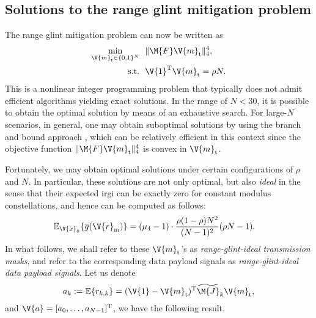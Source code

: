 \documentclass[journal,a4paper,10pt, romanappendices]{IEEEtran}
\begin{document}
\subsection{Solutions to the range glint mitigation problem}\label{ssec:solving_rgm}
The range glint mitigation problem can now be written as
\begin{subequations}\label{opt_generic}
\begin{align}
    \min_{\V{m}_{\rm t}\in\{0,1\}^N}&~~\|\M{F}\V{m}_{\rm t}\|_4^4,\\
    {\rm s.t.}&~~\V{1}^{\rm T}\V{m}_{\rm t}=\rho N.
\end{align}
\end{subequations}
This is a nonlinear integer programming problem that typically does not admit efficient algorithms yielding exact solutions. In the range of $N<30$, it is possible to obtain the optimal solution by means of an exhaustive search. For large-$N$ scenarios, in general, one may obtain suboptimal solutions by using the branch and bound approach \cite{bnb}, which can be relatively efficient in this context since the objective function $\|\M{F}\V{m}_{\rm t}\|_4^4$ is convex in $\V{m}_{\rm t}$. 

Fortunately, we may obtain optimal solutions under certain configurations of $\rho$ and $N$. In particular, these solutions are not only optimal, but also \emph{ideal} in the sense that their expected \ac{irgi} can be exactly zero for constant modulus constellations, and hence can be computed as follows:
\begin{align}\label{eirgi_cds}
\mathbb{E}_{\V{x}_0}\{\overline{g}(\V{r}_{\rm m})\} &=(\mu_4-1)\cdot \frac{\rho(1-\rho) N^2}{(N-1)^2} (\rho N-1).
\end{align}
In what follows, we shall refer to these $\V{m}_{\rm t}$'s as \emph{range-glint-ideal transmission masks}, and refer to the corresponding data payload signals as \emph{range-glint-ideal data payload signals}. Let us denote
$$
a_k := \mathbb{E}\{r_{k,k}\}=(\V{1}-\V{m}_{\rm t})^{\rm T}\widetilde{\M{J}}_k\V{m}_{\rm t},
$$
and $\V{a}=[a_0,\dotsc,a_{N-1}]^{\rm T}$, we have the following result.
\end{document}
